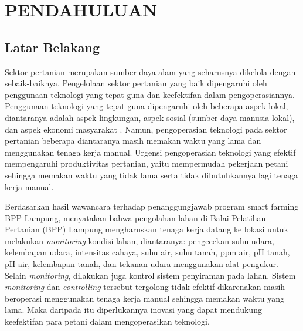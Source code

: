 \chapter{PENDAHULUAN}

\vspace{4.5pt}

\begin{flushleft}
  \begin{justify}
    \section{Latar Belakang} 
    Sektor pertanian merupakan sumber daya alam yang seharusnya dikelola dengan sebaik-baiknya. 
    Pengelolaan sektor pertanian yang baik dipengaruhi oleh penggunaan teknologi yang tepat guna dan keefektifan dalam pengoperasiannya. 
    Penggunaan teknologi yang tepat guna dipengaruhi oleh beberapa aspek lokal, diantaranya adalah aspek lingkungan, aspek sosial (sumber daya manusia lokal), dan aspek ekonomi masyarakat \cite{dokumenBalitbang,teknologi}. Namun, pengoperasian teknologi pada sektor pertanian beberapa diantaranya masih 
    memakan waktu yang lama dan menggunakan tenaga kerja manual. Urgensi pengoperasian teknologi yang efektif mempengaruhi produktivitas 
    pertanian, yaitu mempermudah pekerjaan petani sehingga memakan waktu yang tidak lama serta tidak dibutuhkannya lagi tenaga kerja manual. 

    Berdasarkan hasil wawancara terhadap penanggungjawab program smart farming BPP Lampung, menyatakan bahwa pengolahan lahan di 
    Balai Pelatihan Pertanian (BPP) Lampung mengharuskan tenaga kerja datang ke lokasi untuk melakukan \textit{monitoring} 
    kondisi lahan, diantaranya: pengecekan suhu udara, kelembapan udara, intensitas cahaya, suhu air, suhu tanah, ppm air, 
    pH tanah, pH air, kelembapan tanah, dan tekanan udara menggunakan alat pengukur. Selain \textit{monitoring}, dilakukan juga 
    kontrol sistem penyiraman pada lahan. Sistem \textit{monitoring} dan \textit{controlling} tersebut tergolong tidak efektif 
    dikarenakan masih beroperasi menggunakan tenaga kerja manual sehingga memakan waktu yang lama. Maka daripada itu diperlukannya  
    inovasi yang dapat mendukung keefektifan para petani dalam mengoperasikan teknologi. 


\end{justify}
\end{flushleft}
